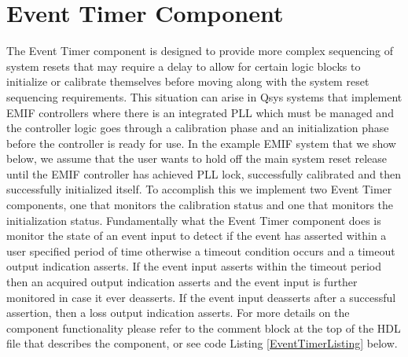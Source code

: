 \documentclass{article}
\begin{document}
\section*{Event Timer Component}
\begin{flushleft}
\noindent
The Event Timer component is designed to provide more complex sequencing of system resets that may require a delay to allow for certain logic blocks to initialize or calibrate themselves before moving along with the system reset sequencing requirements.  This situation can arise in Qsys systems that implement EMIF controllers where there is an integrated PLL which must be managed and the controller logic goes through a calibration phase and an initialization phase before the controller is ready for use.  In the example EMIF system that we show below, we assume that the user wants to hold off the main system reset release until the EMIF controller has achieved PLL lock, successfully calibrated and then successfully initialized itself.  To accomplish this we implement two Event Timer components, one that monitors the calibration status and one that monitors the initialization status.  Fundamentally what the Event Timer component does is monitor the state of an event input to detect if the event has asserted within a user specified period of time otherwise a timeout condition occurs and a timeout output indication asserts.  If the event input asserts within the timeout period then an acquired output indication asserts and the event input is further monitored in case it ever deasserts.  If the event input deasserts after a successful assertion, then a loss output indication asserts.  For more details on the component functionality please refer to the comment block at the top of the HDL file that describes the component, or see code Listing \ref{EventTimerListing} below.


\end{flushleft}
\end{document}

